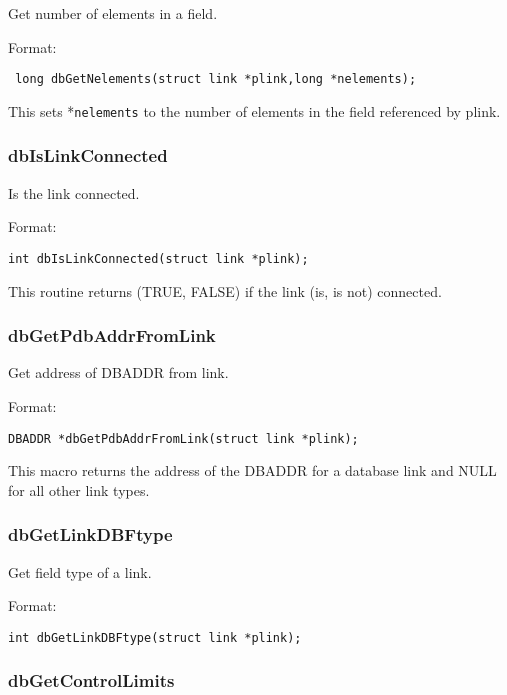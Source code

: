 Get number of elements in a field.

Format:

\begin{verbatim}
 long dbGetNelements(struct link *plink,long *nelements);
\end{verbatim}

This sets *\verb|nelements| to the number of elements in the field referenced by plink.

\subsubsection{dbIsLinkConnected}

Is the link connected.

Format:

\begin{verbatim}
int dbIsLinkConnected(struct link *plink);
\end{verbatim}

This routine returns (TRUE, FALSE) if the link (is, is not) connected.

\subsubsection{dbGetPdbAddrFromLink}

Get address of DBADDR from link.

Format:

\begin{verbatim}
DBADDR *dbGetPdbAddrFromLink(struct link *plink);
\end{verbatim}

This macro returns the address of the DBADDR for a database link and NULL for all other link types.

\subsubsection{dbGetLinkDBFtype}

Get field type of a link.

Format:

\begin{verbatim}
int dbGetLinkDBFtype(struct link *plink);
\end{verbatim}

\subsubsection{dbGetControlLimits}

